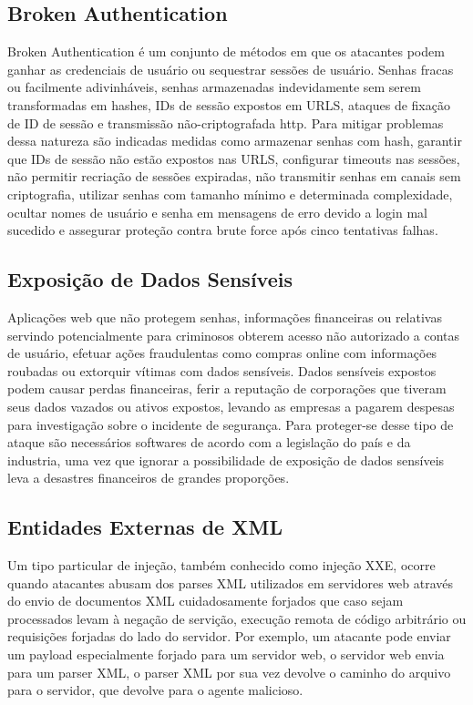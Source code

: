 \subsection{Broken Authentication}
Broken Authentication é um conjunto de métodos em que os atacantes podem ganhar as credenciais de usuário ou sequestrar sessões de usuário. Senhas fracas ou facilmente adivinháveis, senhas armazenadas indevidamente sem serem transformadas em hashes, IDs de sessão expostos em URLS, ataques de fixação de ID de sessão e transmissão não-criptografada http.
Para mitigar problemas dessa natureza são indicadas medidas como armazenar senhas com hash, garantir que IDs de sessão não estão expostos nas URLS, configurar timeouts nas sessões, não permitir recriação de sessões expiradas, não transmitir senhas em canais sem criptografia, utilizar senhas com tamanho mínimo e determinada complexidade, ocultar nomes de usuário e senha em mensagens de erro devido a login mal sucedido e assegurar proteção contra brute force após cinco tentativas falhas.

\subsection{Exposição de Dados Sensíveis}
Aplicações web que não protegem senhas, informações financeiras ou relativas servindo potencialmente para criminosos obterem acesso não autorizado a contas de usuário, efetuar ações fraudulentas como compras online com informações roubadas ou extorquir vítimas com dados sensíveis. Dados sensíveis expostos podem causar perdas financeiras, ferir a reputação de corporações que tiveram seus dados vazados ou ativos expostos, levando as empresas a pagarem despesas para investigação sobre o incidente de segurança. Para proteger-se desse tipo de ataque são necessários softwares de acordo com a legislação do país e da industria, uma vez que ignorar a possibilidade de exposição de dados sensíveis leva a desastres financeiros de grandes proporções. 

\subsection{Entidades Externas de XML}
Um tipo particular de injeção, também conhecido como injeção XXE, ocorre quando atacantes abusam dos parses XML utilizados em servidores web através do envio de documentos XML cuidadosamente forjados que caso sejam processados levam à negação de servição, execução remota de código arbitrário ou requisições forjadas do lado do servidor.
Por exemplo, um atacante pode enviar um payload especialmente forjado para um servidor web, o servidor web envia para um parser XML, o parser XML por sua vez devolve o caminho do arquivo para o servidor, que devolve para o agente malicioso.

